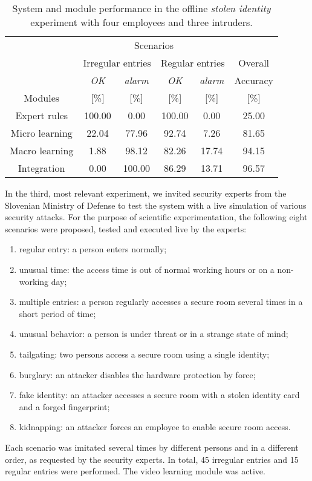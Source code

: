 \begin{table}[!ht]
\centering

\begin{tabular}{cccccc}
\toprule
\multicolumn{ 1}{c}{} &                   \multicolumn{ 4}{c}{Scenarios} &            \\
		& \multicolumn{ 2}{c}{Irregular entries} & \multicolumn{ 2}{c}{Regular entries} &   Overall  \\
 		&   {\it OK} & {\it alarm} &   {\it OK} & {\it alarm} &   Accuracy \\
Modules	&   [\%] & [\%] &   [\%] & [\%] &  [\%] \\
\hline
Expert rules &   100.00 &     0.00 &   100.00 &     0.00 &    25.00 \\

Micro learning &    22.04 &    77.96 &    92.74 &     7.26 &    81.65 \\

Macro learning &     1.88 &    98.12 &    82.26 &    17.74 &    94.15 \\
\hline
Integration &     0.00 &   100.00 &    86.29 &    13.71 &    96.57 \\
\toprule
\end{tabular}  
  
 
\caption{System and module performance in the offline \textit{stolen identity} experiment with four employees and three intruders.}
\label{tab:dataset2}
\end{table}

In the third, most relevant experiment, we invited security experts from the Slovenian Ministry of Defense to test the system with a live simulation of various security attacks.  For the purpose of scientific experimentation, the following eight scenarios were proposed, tested and executed live by the experts:
\begin{enumerate}
    \item regular entry: a person enters normally;
    \item unusual time: the access time is out of normal working hours or on a non-working day;
    \item multiple entries: a person regularly accesses a secure room several times in a short period of time;
    \item unusual behavior: a person is under threat or in a strange state of mind;
    \item tailgating: two persons access a secure room using a single identity;
    \item burglary: an attacker disables the hardware protection by force;
    \item fake identity: an attacker accesses a secure room with a stolen identity card and a forged fingerprint;
    \item kidnapping: an attacker forces an employee to enable secure room access.
\end{enumerate}
Each scenario was imitated several times by different persons and in a different order, as requested by the security experts. In total, 45 irregular entries and 15 regular entries were performed. The video learning module was active.

